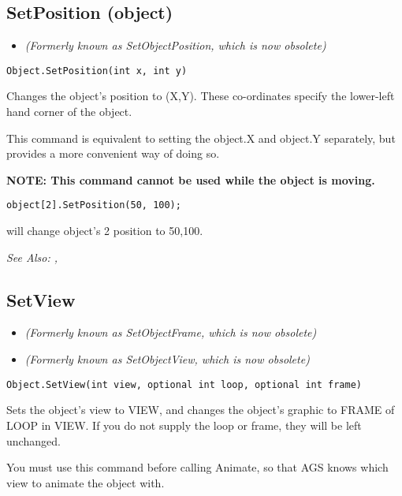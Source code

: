 \subsection{SetPosition (object)}\label{Object.SetPosition}%

\begin{itemize}
\item \it{(Formerly known as SetObjectPosition, which is now obsolete)}
\end{itemize}

\begin{verbatim}
Object.SetPosition(int x, int y)
\end{verbatim}
Changes the object's position to (X,Y). These co-ordinates specify the lower-left
hand corner of the object.

This command is equivalent to setting the object.X and object.Y separately, but provides a
more convenient way of doing so.

\bf{NOTE:} This command cannot be used while the object is moving.

\begin{verbatim}
object[2].SetPosition(50, 100);
\end{verbatim}
will change object's 2 position to 50,100.

\it{See Also:} , 


\subsection{SetView}\label{Object.SetView}%

\begin{itemize}
\item \it{(Formerly known as SetObjectFrame, which is now obsolete)}
\item \it{(Formerly known as SetObjectView, which is now obsolete)}
\end{itemize}

\begin{verbatim}
Object.SetView(int view, optional int loop, optional int frame)
\end{verbatim}
Sets the object's view to VIEW, and changes the object's graphic to FRAME of LOOP in VIEW.
If you do not supply the loop or frame, they will be left unchanged.

You must use this command before calling Animate, so that AGS knows which view to animate
the object with.

